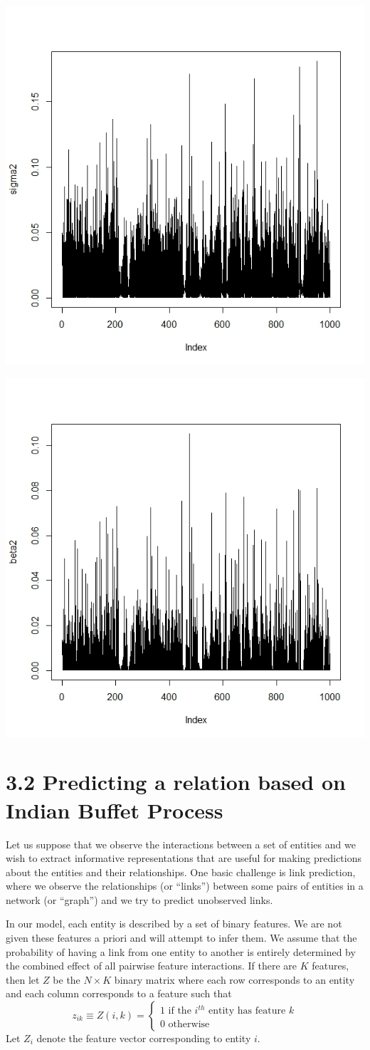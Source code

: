 \documentclass[]{article}
\begin{document}
	\begin{center}
		
		\includegraphics[width=.4\textwidth]{task5/CSMC_sigma2_convergence.jpeg}
		
		\includegraphics[width=.4\textwidth]{task5/CSMC_beta2_convergence.jpeg}
		
	\end{center}
	
	
	\newpage
	
	\section*{3.2 Predicting a relation based on Indian Buffet Process}
	Let us suppose that we observe the interactions between a set of entities and we wish to extract informative representations that are useful for making predictions about the entities and their relationships. One basic challenge is link prediction, where we observe the relationships (or “links”) between some pairs of entities in a network (or “graph”) and we try to predict unobserved links. 
	
	In our model, each entity is described by a set of binary features. We are not given these features a priori and will attempt to infer them. We assume that the probability of having a link from one entity to another is entirely determined by the combined effect of all pairwise feature interactions. If there are $K$ features, then let $Z$ be the $N \times K$ binary matrix where each row corresponds to an entity and each column corresponds to a feature such that
	$$ 
	z_{ik} \equiv Z(i,k) = 
	\begin{cases}
	1 \text{\ \ \ if the $i^{th}$ entity has feature $k$} \\
	0 \text{\ \ \ otherwise}
	\end{cases}
	$$
	Let $Z_i$ denote the feature vector corresponding to entity $i$.
	
\end{document}
